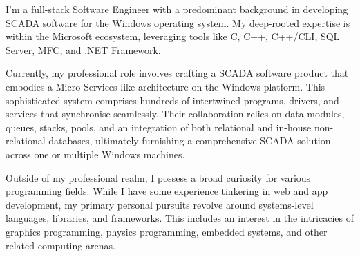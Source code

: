 \documentclass[9pt]{developercv} %
\begin{document}
\vspace{0.5cm}


\begin{minipage}[t]{1\textwidth} %


	I'm a full-stack Software Engineer with a predominant background in developing SCADA software for the Windows operating system. My deep-rooted expertise is within the Microsoft ecosystem, leveraging tools like C, C++, C++/CLI, SQL Server, MFC, and .NET Framework.

	\vspace{0.5cm}	

	Currently, my professional role involves crafting a SCADA software product that embodies a Micro-Services-like architecture on the Windows platform. This sophisticated system comprises hundreds of intertwined programs, drivers, and services that synchronise seamlessly. Their collaboration relies on data-modules, queues, stacks, pools, and an integration of both relational and in-house non-relational databases, ultimately furnishing a comprehensive SCADA solution across one or multiple Windows machines.
	
	\vspace{0.5cm}	

	Outside of my professional realm, I possess a broad curiosity for various programming fields. While I have some experience tinkering in web and app development, my primary personal pursuits revolve around systems-level languages, libraries, and frameworks. This includes an interest in the intricacies of graphics programming, physics programming, embedded systems, and other related computing arenas.

\end{minipage}

\vspace{1cm}	

\end{document}
